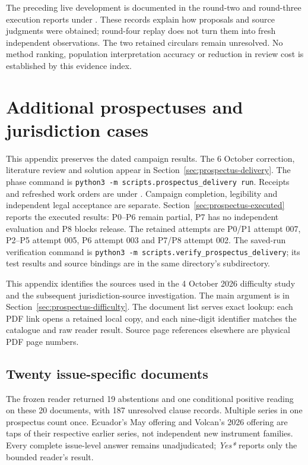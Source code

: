 \documentclass[12pt,a4paper,oneside,openany]{book}
\begin{document}
The preceding live development is documented in the round-two and round-three
execution reports under . These records explain how
proposals and source judgments were obtained; round-four replay does not turn
them into fresh independent observations. The two retained circulars remain
unresolved. No method ranking, population interpretation accuracy or reduction
in review cost is established by this evidence index.

\chapter{Additional prospectuses and jurisdiction cases}
\label{app:prospectus-difficulty}

This appendix preserves the dated campaign results. The 6 October correction,
literature review and solution appear in Section~\ref{sec:prospectus-delivery}.
The phase command is \texttt{python3 -m scripts.prospectus\_delivery run}.
Receipts and refreshed work orders are under
.
Campaign completion, legibility and independent legal acceptance are separate.
Section~\ref{sec:prospectus-executed} reports the executed results: P0--P6
remain partial, P7 has no independent evaluation and P8 blocks release.
The retained attempts are P0/P1 attempt 007, P2--P5 attempt 005,
P6 attempt 003 and P7/P8 attempt 002.
The saved-run verification command is
\texttt{python3 -m scripts.verify\_prospectus\_delivery};
its test results and source bindings are in the same directory's
 subdirectory.

This appendix identifies the sources used in the 4 October 2026 difficulty
study and the subsequent jurisdiction-source investigation. The main
argument is in Section~\ref{sec:prospectus-difficulty}. The document list
serves exact lookup: each PDF link opens a retained local copy, and each
nine-digit identifier matches the catalogue and raw reader result. Source
page references elsewhere are physical PDF page numbers.

\section{Twenty issue-specific documents}

The frozen reader returned 19 abstentions and one conditional positive
reading on these 20 documents, with 187 unresolved clause records. Multiple
series in one prospectus count once. Ecuador's May offering and Volcan's
2026 offering are taps of their respective earlier series, not independent
new instrument families. Every complete issue-level answer remains
unadjudicated; \emph{Yes*} reports only the bounded reader's result.
\end{document}
